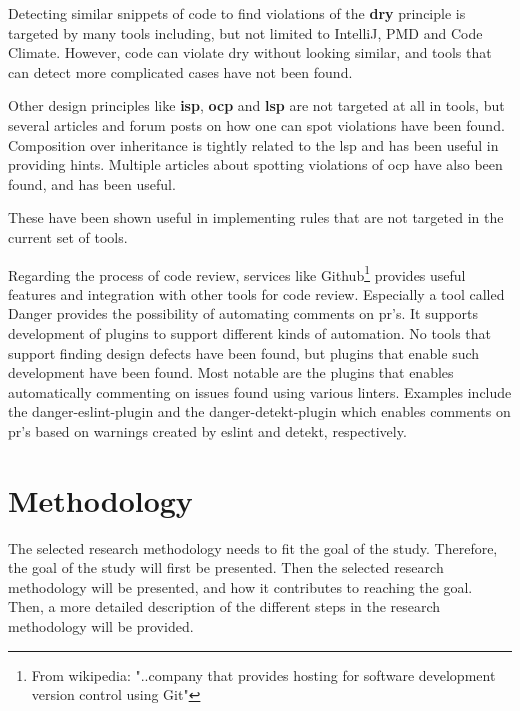 \documentclass{report}
\begin{document}
Detecting similar snippets of code to find violations of the \textbf{\gls{dry}} principle is targeted by many tools including, but not limited to IntelliJ\cite{IntelliJ}, PMD\cite{pmd} and Code Climate\cite{codeclimate}. However, code can violate \gls{dry} without looking similar, and tools that can detect more complicated cases have not been found.  

Other design principles like \textbf{\gls{isp}}, \textbf{\gls{ocp}} and \textbf{\gls{lsp}} are not targeted at all in tools, but several articles and forum posts on how one can spot violations have been found. Composition over inheritance is tightly related to the \gls{lsp} and \cite{composition-over-inheritance-stackoverflow} has been useful in providing hints. Multiple articles about spotting violations of \gls{ocp} have also been found, and has been useful.

 These have been shown useful in implementing rules that are not targeted in the current set of tools.

Regarding the process of code review, services like Github\cite{github}\footnote{From wikipedia: "..company that provides hosting for software development version control using Git"\cite{github-wiki}} provides useful features and integration with other tools for code review. Especially a tool called Danger\cite{danger} provides the possibility of automating comments on \gls{pr}'s. It supports development of plugins to support different kinds of automation. No tools that support finding design defects have been found, but plugins that enable such development have been found. Most notable are the plugins that enables automatically commenting on issues found using various linters. Examples include the danger-eslint-plugin\cite{danger-eslint-plugin} and the danger-detekt-plugin\cite{danger-detekt-plugin} which enables comments on \gls{pr}'s based on warnings created by eslint\cite{eslint} and detekt\cite{detekt}, respectively. 

\chapter{Methodology}
\label{methodology}
The selected research methodology needs to fit the goal of the study. Therefore, the goal of the study will first be presented. Then the selected research methodology will be presented, and how it contributes to reaching the goal. Then, a more detailed description of the different steps in the research methodology will be provided. 
\end{document}
